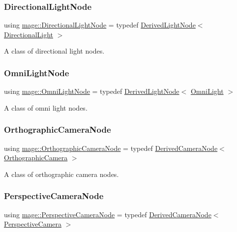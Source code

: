 \subsubsection{\texorpdfstring{Directional\+Light\+Node}{DirectionalLightNode}}
{\footnotesize\ttfamily using \hyperlink{namespacemage_a7637b5351fc0f66a10badd80ebb35899}{mage\+::\+Directional\+Light\+Node} = typedef \hyperlink{classmage_1_1_derived_light_node}{Derived\+Light\+Node}$<$ \hyperlink{classmage_1_1_directional_light}{Directional\+Light} $>$}

A class of directional light nodes. \hypertarget{namespacemage_a1724c6e6b6b5ba535cdd967cbbb4a669}{}\label{namespacemage_a1724c6e6b6b5ba535cdd967cbbb4a669} 
\subsubsection{\texorpdfstring{Omni\+Light\+Node}{OmniLightNode}}
{\footnotesize\ttfamily using \hyperlink{namespacemage_a1724c6e6b6b5ba535cdd967cbbb4a669}{mage\+::\+Omni\+Light\+Node} = typedef \hyperlink{classmage_1_1_derived_light_node}{Derived\+Light\+Node}$<$ \hyperlink{classmage_1_1_omni_light}{Omni\+Light} $>$}

A class of omni light nodes. \hypertarget{namespacemage_a7d62ab5877be3e14a9735014b77d3f55}{}\label{namespacemage_a7d62ab5877be3e14a9735014b77d3f55} 
\subsubsection{\texorpdfstring{Orthographic\+Camera\+Node}{OrthographicCameraNode}}
{\footnotesize\ttfamily using \hyperlink{namespacemage_a7d62ab5877be3e14a9735014b77d3f55}{mage\+::\+Orthographic\+Camera\+Node} = typedef \hyperlink{classmage_1_1_derived_camera_node}{Derived\+Camera\+Node}$<$ \hyperlink{classmage_1_1_orthographic_camera}{Orthographic\+Camera} $>$}

A class of orthographic camera nodes. \hypertarget{namespacemage_ad6f2ef4a25873e73e8fa38b06425939f}{}\label{namespacemage_ad6f2ef4a25873e73e8fa38b06425939f} 
\subsubsection{\texorpdfstring{Perspective\+Camera\+Node}{PerspectiveCameraNode}}
{\footnotesize\ttfamily using \hyperlink{namespacemage_ad6f2ef4a25873e73e8fa38b06425939f}{mage\+::\+Perspective\+Camera\+Node} = typedef \hyperlink{classmage_1_1_derived_camera_node}{Derived\+Camera\+Node}$<$ \hyperlink{classmage_1_1_perspective_camera}{Perspective\+Camera} $>$}

